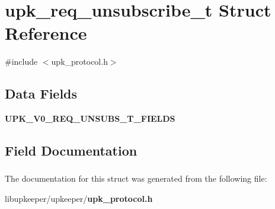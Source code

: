 \section{upk\_\-req\_\-unsubscribe\_\-t Struct Reference}
\label{structupk__req__unsubscribe__t}


{\ttfamily \#include $<$upk\_\-protocol.h$>$}

\subsection*{Data Fields}
\begin{DoxyCompactItemize}
\item 
{\bf UPK\_\-V0\_\-REQ\_\-UNSUBS\_\-T\_\-FIELDS}
\end{DoxyCompactItemize}


\subsection{Field Documentation}
\subsubsection[{UPK\_\-V0\_\-REQ\_\-UNSUBS\_\-T\_\-FIELDS}]{}\label{structupk__req__unsubscribe__t_ada8e9bdec7dc31dabccca69f374e5573}


The documentation for this struct was generated from the following file:\begin{DoxyCompactItemize}
\item 
libupkeeper/upkeeper/{\bf upk\_\-protocol.h}\end{DoxyCompactItemize}
